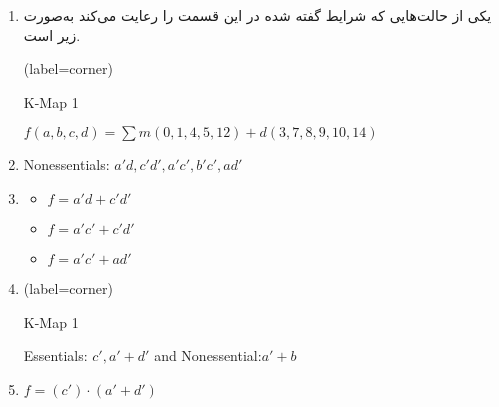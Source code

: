 \begin{enumerate}
	\item 
	یکی از حالت‌هایی که شرایط گفته شده در این قسمت را رعایت می‌کند به‌صورت زیر است.
	
	\begin{latin}
		\centering
		\begin{karnaugh-map}[4][4][1][$b$][$a$][$d$][$c$](label=corner)
		\end{karnaugh-map}
		\caption{K-Map 1}
		$f(a,b,c,d)=\sum m(0,1,4,5,12) + d(3,7,8,9,10,14)$
	\end{latin}
	
	
	\item
	\begin{latin}
		Nonessentials: $a'd, c'd', a'c', b'c', ad'$
	\end{latin}
	
	
	\item
	\begin{latin}
		\begin{itemize}
			\item 
			$f = a'd + c'd'$
			
			\item 
			$f = a'c' + c'd'$
			
			\item 
			$f = a'c' + ad'$
		\end{itemize}
	\end{latin}
	
	
	\item 
	\begin{latin}
		\centering
		\begin{karnaugh-map}[4][4][1][$b$][$a$][$d$][$c$](label=corner)
		\end{karnaugh-map}
		\caption{K-Map 1}
		Essentials: $c', a' + d'$ and Nonessential:$a' + b$
	\end{latin}
	
	
	\item 
	\begin{latin}
		$f=(c') \cdot (a'+d')$
	\end{latin}
	
\end{enumerate}




